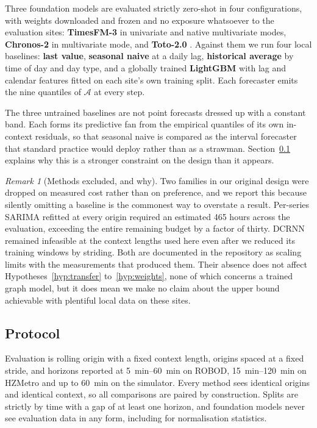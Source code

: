 \documentclass[11pt]{article}
\theoremstyle{plain}
\theoremstyle{definition}
\theoremstyle{remark}
\newtheorem{remark}[theorem]{Remark}
\begin{document}
Three foundation models are evaluated strictly zero-shot in four configurations, with weights downloaded and frozen and no exposure whatsoever to the evaluation sites: \textbf{TimesFM-3} \citep{timesfm3} in univariate and native multivariate modes, \textbf{Chronos-2} \citep{ansari2025chronos2} in multivariate mode, and \textbf{Toto-2.0} \citep{khwaja2026toto2}. Against them we run four local baselines: \textbf{last value}, \textbf{seasonal naive} at a daily lag, \textbf{historical average} by time of day and day type, and a globally trained \textbf{LightGBM} with lag and calendar features fitted on each site's own training split. Each forecaster emits the nine quantiles of $\mathcal{A}$ at every step.

The three untrained baselines are not point forecasts dressed up with a constant band. Each forms its predictive fan from the empirical quantiles of its own in-context residuals, so that seasonal naive is compared as the interval forecaster that standard practice would deploy rather than as a strawman. Section~\ref{sec:protocol} explains why this is a stronger constraint on the design than it appears.

\begin{remark}[Methods excluded, and why]
Two families in our original design were dropped on measured cost rather than on preference, and we report this because silently omitting a baseline is the commonest way to overstate a result. Per-series SARIMA refitted at every origin required an estimated \num{465} hours across the evaluation, exceeding the entire remaining budget by a factor of thirty. DCRNN \citep{li2018dcrnn} remained infeasible at the context lengths used here even after we reduced its training windows by striding. Both are documented in the repository as scaling limits with the measurements that produced them. Their absence does not affect Hypotheses~\ref{hyp:transfer} to~\ref{hyp:weights}, none of which concerns a trained graph model, but it does mean we make no claim about the upper bound achievable with plentiful local data on these sites.
\end{remark}

\subsection{Protocol}
\label{sec:protocol}

Evaluation is rolling origin with a fixed context length, origins spaced at a fixed stride, and horizons reported at \SIrange{5}{60}{\minute} on ROBOD, \SIrange{15}{120}{\minute} on HZMetro and up to \SI{60}{\minute} on the simulator. Every method sees identical origins and identical context, so all comparisons are paired by construction. Splits are strictly by time with a gap of at least one horizon, and foundation models never see evaluation data in any form, including for normalisation statistics.
\end{document}
